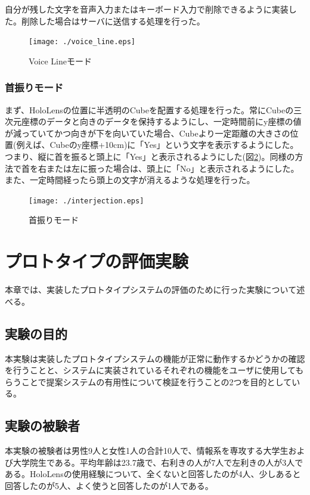 \documentclass[11pt,a4j, titlepage]{jarticle} %
\begin{document}
自分が残した文字を音声入力またはキーボード入力で削除できるように実装した。削除した場合はサーバに送信する処理を行った。

\begin{figure}[H]
  \begin{center}
    \texttt{[image: ./voice\_line.eps]}
    \caption{Voice Lineモード}
    \label{fig:voice_line}
  \end{center}
\end{figure}


\subsubsection{首振りモード}
まず、HoloLensの位置に半透明のCubeを配置する処理を行った。常にCubeの三次元座標のデータと向きのデータを保持するようにし、一定時間前にy座標の値が減っていてかつ向きが下を向いていた場合、Cubeより一定距離の大きさの位置(例えば、Cubeのy座標+10cm)に「Yes」という文字を表示するようにした。つまり、縦に首を振ると頭上に「Yes」と表示されるようにした(図\ref{fig:interjection})。同様の方法で首を右または左に振った場合は、頭上に「No」と表示されるようにした。また、一定時間経ったら頭上の文字が消えるような処理を行った。

\begin{figure}[H]
  \begin{center}
    \texttt{[image: ./interjection.eps]}
    \caption{首振りモード}
    \label{fig:interjection}
  \end{center}
\end{figure}


\newpage
\section{プロトタイプの評価実験}
本章では、実装したプロトタイプシステムの評価のために行った実験について述べる。

\subsection{実験の目的}
本実験は実装したプロトタイプシステムの機能が正常に動作するかどうかの確認を行うことと、システムに実装されているそれぞれの機能をユーザに使用してもらうことで提案システムの有用性について検証を行うことの2つを目的としている。

\subsection{実験の被験者}
本実験の被験者は男性9人と女性1人の合計10人で、情報系を専攻する大学生および大学院生である。平均年齢は23.7歳で、右利きの人が7人で左利きの人が3人である。HoloLensの使用経験について、全くないと回答したのが4人、少しあると回答したのが5人、よく使うと回答したのが1人である。
\end{document}
